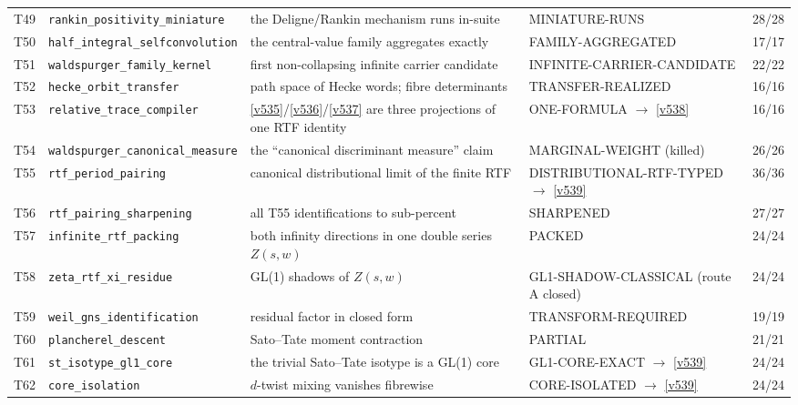 \documentclass[11pt,a4paper]{article}
\begin{document}
{\begin{xltabular}{\linewidth}{@{}p{0.95cm} >{\raggedright\arraybackslash}p{3.1cm} Y >{\raggedright\scriptsize\arraybackslash}p{3.35cm} p{1.15cm}@{}}
T49 & \texttt{\scriptsize rankin\_\allowbreak positivity\_\allowbreak miniature} & the Deligne/Rankin mechanism runs in-suite & MINIATURE-RUNS & 28/28\\
T50 & \texttt{\scriptsize half\_\allowbreak integral\_\allowbreak selfconvolution} & the central-value family aggregates exactly & FAMILY-AGGREGATED & 17/17\\
T51 & \texttt{\scriptsize waldspurger\_\allowbreak family\_\allowbreak kernel} & first non-collapsing infinite carrier candidate & INFINITE-CARRIER-CANDIDATE & 22/22\\
T52 & \texttt{\scriptsize hecke\_\allowbreak orbit\_\allowbreak transfer} & path space of Hecke words; fibre determinants & TRANSFER-REALIZED & 16/16\\
T53 & \texttt{\scriptsize relative\_\allowbreak trace\_\allowbreak compiler} & \vref{v535}/\vref{v536}/\vref{v537} are three projections of one RTF identity & ONE-FORMULA $\to$ \vref{v538} & 16/16\\
T54 & \texttt{\scriptsize waldspurger\_\allowbreak canonical\_\allowbreak measure} & the ``canonical discriminant measure'' claim & MARGINAL-WEIGHT (killed) & 26/26\\
T55 & \texttt{\scriptsize rtf\_\allowbreak period\_\allowbreak pairing} & canonical distributional limit of the finite RTF & DISTRIBUTIONAL-RTF-TYPED $\to$ \vref{v539} & 36/36\\
T56 & \texttt{\scriptsize rtf\_\allowbreak pairing\_\allowbreak sharpening} & all T55 identifications to sub-percent & SHARPENED & 27/27\\
T57 & \texttt{\scriptsize infinite\_\allowbreak rtf\_\allowbreak packing} & both infinity directions in one double series $Z(s,w)$ & PACKED & 24/24\\
T58 & \texttt{\scriptsize zeta\_\allowbreak rtf\_\allowbreak xi\_\allowbreak residue} & GL(1) shadows of $Z(s,w)$ & GL1-SHADOW-CLASSICAL (route A closed) & 24/24\\
T59 & \texttt{\scriptsize weil\_\allowbreak gns\_\allowbreak identification} & residual factor in closed form & TRANSFORM-REQUIRED & 19/19\\
T60 & \texttt{\scriptsize plancherel\_\allowbreak descent} & Sato--Tate moment contraction & PARTIAL & 21/21\\
T61 & \texttt{\scriptsize st\_\allowbreak isotype\_\allowbreak gl1\_\allowbreak core} & the trivial Sato--Tate isotype is a GL(1) core & GL1-CORE-EXACT $\to$ \vref{v539} & 24/24\\
T62 & \texttt{\scriptsize core\_\allowbreak isolation} & $d$-twist mixing vanishes fibrewise & CORE-ISOLATED $\to$ \vref{v539} & 24/24\\

\end{xltabular}}
\end{document}
